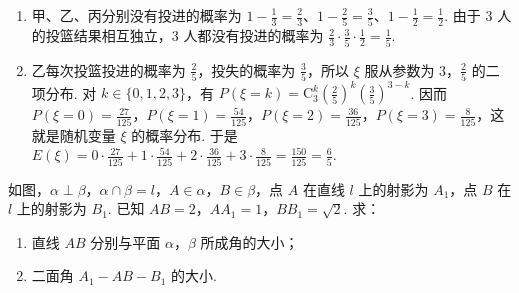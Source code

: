 \begin{solution}
\begin{enumerate}
\item 甲、乙、丙分别没有投进的概率为 \(1-\frac{1}{3}=\frac{2}{3}\)、\(1-\frac{2}{5}=\frac{3}{5}\)、\(1-\frac{1}{2}=\frac{1}{2}\). 由于 3 人的投篮结果相互独立，3 人都没有投进的概率为 \(\frac{2}{3}\cdot\frac{3}{5}\cdot\frac{1}{2}=\frac{1}{5}\).
\item 乙每次投篮投进的概率为 \(\frac{2}{5}\)，投失的概率为 \(\frac{3}{5}\)，所以 \(\xi\) 服从参数为 \(3\)，\(\frac{2}{5}\) 的二项分布. 对 \(k\in\{0,1,2,3\}\)，有 \(P(\xi=k)=\mathrm C_3^k\left(\frac{2}{5}\right)^k\left(\frac{3}{5}\right)^{3-k}\). 因而 \(P(\xi=0)=\frac{27}{125}\)，\(P(\xi=1)=\frac{54}{125}\)，\(P(\xi=2)=\frac{36}{125}\)，\(P(\xi=3)=\frac{8}{125}\)，这就是随机变量 \(\xi\) 的概率分布. 于是 \(E(\xi)=0\cdot\frac{27}{125}+1\cdot\frac{54}{125}+2\cdot\frac{36}{125}+3\cdot\frac{8}{125}=\frac{150}{125}=\frac{6}{5}\).
\end{enumerate}
\end{solution}

\begin{problem}
如图，\(\alpha \perp \beta\)，\(\alpha \cap \beta = l\)，\(A \in \alpha\)，\(B \in \beta\)，点 \(A\) 在直线 \(l\) 上的射影为 \(A_1\)，点 \(B\) 在 \(l\) 上的射影为 \(B_1\). 已知 \(AB = 2\)，\(AA_1 = 1\)，\(BB_1 = \sqrt{2}\). 求：

\begin{enumerate}
\item 直线 \(AB\) 分别与平面 \(\alpha\)，\(\beta\) 所成角的大小；
\item 二面角 \(A_{1} - AB - B_{1}\) 的大小.
\end{enumerate}

\end{problem}

